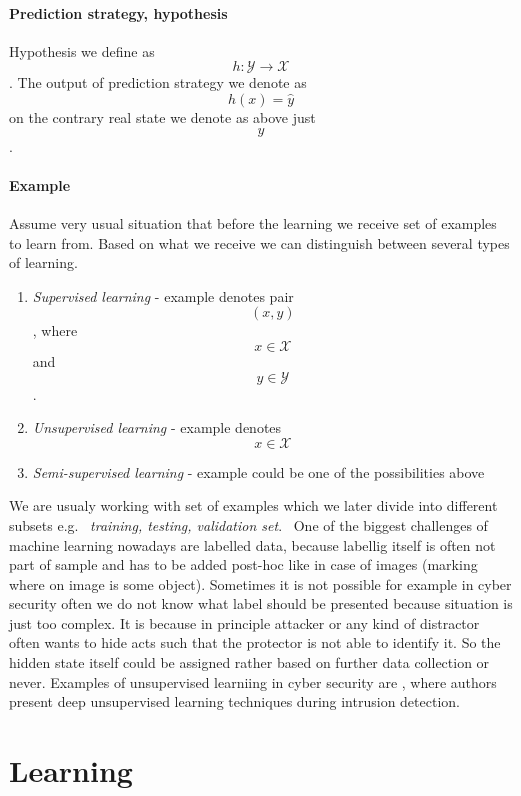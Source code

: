 \paragraph{Prediction strategy, hypothesis}
Hypothesis we define as $$h:\mathcal{Y} \rightarrow \mathcal{X}$$. The output of prediction strategy we denote as $$h(x)=\hat{y}$$ on the contrary real state we denote as above just $$y$$.
\paragraph{Example}
Assume very usual situation that before the learning we receive set of examples to learn from. Based on what we receive we can distinguish between several types of learning. \
\begin{enumerate}
    \item \emph{Supervised learning} - example denotes pair $$(x,y)$$, where $$x\in \mathcal{X}$$ and $$y\in \mathcal{Y}$$. 
    \item \emph{Unsupervised learning} - example denotes $$x\in \mathcal{X}$$
    \item \emph{Semi-supervised learning} - example could be one of the possibilities above
\end{enumerate}
We are usualy working with set of examples which we later divide into different subsets e.g. \ \emph{training, testing, validation set}. \
One of the biggest challenges of machine learning nowadays are labelled data, because labellig itself is often not part of sample and has to be added post-hoc like in case of images (marking where on image is some object). Sometimes it is not possible for example in cyber security often we do not know what label should be presented because situation is just too complex. It is because in principle attacker or any kind of distractor often wants to hide acts such that the protector is not able to identify it. So the hidden state itself could be assigned rather based on further data collection or never. Examples of unsupervised learniing in cyber security are \cite{Alom2017}, where authors present deep unsupervised learning techniques during intrusion detection.

\section{Learning}

